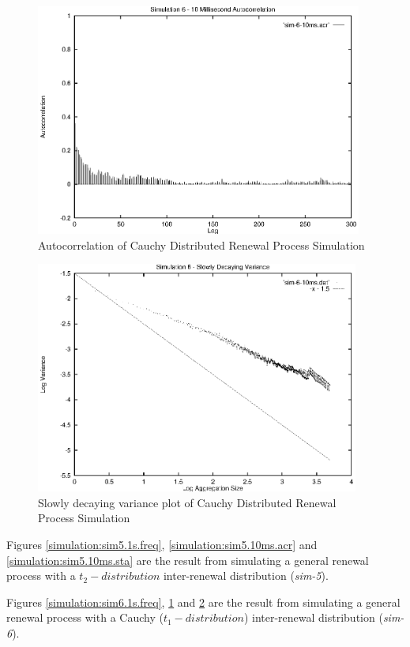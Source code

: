 \begin{figure}
\includegraphics[height=3in]{pics/sim-6-10ms-acr.eps}
\caption{Autocorrelation of Cauchy Distributed Renewal Process Simulation}
\label{simulation:sim6.10ms.acr}
\end{figure}

\begin{figure}
\includegraphics[height=3in]{pics/sim-6-10ms-sta.eps}
\caption{Slowly decaying variance plot of Cauchy Distributed Renewal Process Simulation}
\label{simulation:sim6.10ms.sta}
\end{figure}

Figures \ref{simulation:sim5.1s.freq}, \ref{simulation:sim5.10ms.acr}
and \ref{simulation:sim5.10ms.sta} are the result from simulating a
general renewal process with a $t_2-distribution$ inter-renewal
distribution (\emph{sim-5}).

Figures \ref{simulation:sim6.1s.freq}, \ref{simulation:sim6.10ms.acr}
and \ref{simulation:sim6.10ms.sta} are the result from simulating a
general renewal process with a Cauchy ($t_1-distribution$) inter-renewal
distribution (\emph{sim-6}).

